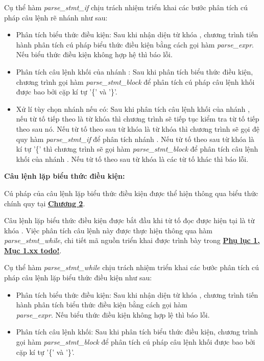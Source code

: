 Cụ thể hàm \textit{parse\_stmt\_if} chịu trách nhiệm triển khai các bước phân tích cú pháp câu lệnh rẽ nhánh như sau:
\begin{itemize}
    \item Phân tích biểu thức điều kiện: 
    Sau khi nhận diện từ khóa , chương trình tiến hành phân tích cú pháp biểu thức điều kiện bằng cách gọi hàm \textit{parse\_expr}. Nếu biểu thức điều kiện không hợp hệ thì báo lỗi. %
    \item Phân tích câu lệnh khối của nhánh :
    Sau khi phân tích biểu thức điều kiện, chương trình gọi hàm \textit{parse\_stmt\_block} để phân tích cú pháp câu lệnh khối được bao bởi cặp kí tự '\{' và '\}'.
    \item Xử lí tùy chọn nhánh  nếu có:
    Sau khi phân tích câu lệnh khối của nhánh , nếu từ tố tiếp theo là từ khóa  thì chương trình sẽ tiếp tục kiểm tra từ tố tiếp theo sau nó. Nếu từ tố theo sau từ khóa  là từ khóa  thì chương trình sẽ gọi đệ quy hàm \textit{parse\_stmt\_if} để phân tích nhánh . Nếu từ tố theo sau từ khóa  là kí tự '\{' thì chương trình sẽ gọi hàm \textit{parse\_stmt\_block} để phân tích câu lệnh khối của nhánh . Nếu từ tố theo sau từ khóa  là các từ tố khác thì báo lỗi. %

\end{itemize}

\textbf{Câu lệnh lặp biểu thức điều kiện:}

Cú pháp của câu lệnh lặp biểu thức điều kiện được thể hiện thông qua biểu thức chính quy tại \hyperref[ch2:while_stmt]{\bf Chương 2}.

Câu lệnh lặp biểu thức điều kiện được bắt đầu khi từ tố đọc được hiện tại là từ khóa . Việc phân tích câu lệnh này được thực hiện thông qua hàm \textit{parse\_stmt\_while}, chi tiết mã nguồn triển khai được trình bày trong \hyperref[ap1:simple_token]{\bf Phụ lục 1, Mục 1.xx todo!}.

Cụ thể hàm \textit{parse\_stmt\_while} chịu trách nhiệm triển khai các bước phân tích cú pháp câu lệnh lặp biểu thức điều kiện như sau:
\begin{itemize}
    \item Phân tích biểu thức điều kiện:
    Sau khi nhận diện từ khóa , chương trình tiến hành phân tích biểu thức điều kiện bằng cách gọi hàm \\\textit{parse\_expr}. Nếu biểu thức điều kiện không hợp lệ thì báo lỗi. %
    \item Phân tích câu lệnh khối:
    Sau khi phân tích biểu thức điều kiện, chương trình gọi hàm \textit{parse\_stmt\_block} để phân tích cú pháp câu lệnh khối được bao bởi cặp kí tự '\{' và '\}'.%
\end{itemize}

